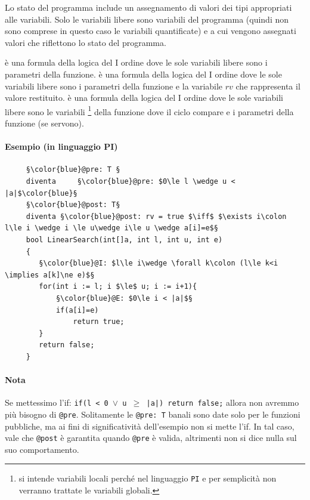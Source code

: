 Lo stato del programma include un assegnamento di valori dei tipi appropriati alle variabili. Solo le variabili libere sono variabili del programma (quindi non sono comprese in questo caso le variabili quantificate) e a cui vengono assegnati valori che riflettono lo stato del programma. 

\begin{itemize}
	è una formula della logica del I ordine dove le sole variabili libere sono i parametri della funzione.
	è una formula della logica del I ordine dove le sole variabili libere sono i parametri della funzione e la variabile $rv$ che rappresenta il valore restituito.
	è una formula della logica del I ordine dove le sole variabili libere sono le variabili \footnote{si intende variabili locali perché nel linguaggio \texttt{PI} e per semplicità non verranno trattate le variabili globali.} della funzione dove il ciclo compare e i parametri della funzione (se servono).
\end{itemize}

\paragraph{Esempio (in linguaggio PI)}
\begin{lstlisting}
	 §\color{blue}@pre: T §
	 diventa	 §\color{blue}@pre: $0\le l \wedge u < |a|$\color{blue}§
	 §\color{blue}@post: T§ 
	 diventa §\color{blue}@post: rv = true $\iff$ $\exists i\colon l\le i \wedge i \le u\wedge i\le u \wedge a[i]=e$§
	 bool LinearSearch(int[]a, int l, int u, int e)
	 {
	 	§\color{blue}@I: $l\le i\wedge \forall k\colon (l\le k<i \implies a[k]\ne e)$§
	 	for(int i := l; i $\le$ u; i := i+1){
	 		§\color{blue}@E: $0\le i < |a|$§
	 		if(a[i]=e)
	 			return true;
	 	}
	 	return false;
	 }
\end{lstlisting}
\paragraph{Nota}Se mettessimo l'if: \texttt{if(l < 0 $\vee$ u $\ge$ |a|) return false;} allora non avremmo più bisogno di \texttt{@pre}. Solitamente le \texttt{@pre: T} banali sono date solo per le funzioni pubbliche, ma ai fini di significatività dell'esempio non si mette l'if. In tal caso, vale che \texttt{@post} è garantita quando \texttt{@pre} è valida, altrimenti non si dice nulla sul suo comportamento. 

